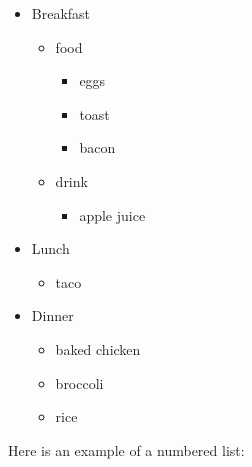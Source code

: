 \documentclass[
]{article}
\providecommand{\tightlist}{%
  \setlength{\itemsep}{0pt}\setlength{\parskip}{0pt}}
\begin{document}
\begin{itemize}
\tightlist
\item
  Breakfast

  \begin{itemize}
  \tightlist
  \item
    food

    \begin{itemize}
    \tightlist
    \item
      eggs
    \item
      toast
    \item
      bacon
    \end{itemize}
  \item
    drink

    \begin{itemize}
    \tightlist
    \item
      apple juice
    \end{itemize}
  \end{itemize}
\item
  Lunch

  \begin{itemize}
  \tightlist
  \item
    taco
  \end{itemize}
\item
  Dinner

  \begin{itemize}
  \tightlist
  \item
    baked chicken
  \item
    broccoli
  \item
    rice
  \end{itemize}
\end{itemize}

Here is an example of a numbered list:
\end{document}
